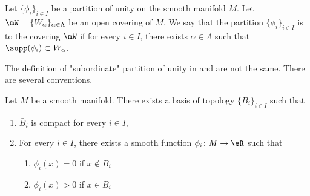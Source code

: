 \begin{definition}			\label{DEFooPJKOooFnCkuk}
	Let \( \{ \phi_i \}_{i\in I}\) be a partition of unity on the smooth manifold \( M\). Let \( \mW=\{ W_{\alpha} \}_{\alpha\in \Lambda}\) be an open covering of \( M\). We say that the partition \( \{ \phi_i \}_{i\in I}\) is  to the covering \( \mW\) if for every \( i\in I\), there exists \( \alpha\in\Lambda\) such that \( \supp(\phi_i)\subset W_{\alpha}\).
\end{definition}

\begin{normaltext}
	The definition of "subordinate" partition of unity in \cite{BIBooAQKHooVyiyN} and \cite{BIBooKCFIooSAYbJK} are not the same. There are several conventions.
\end{normaltext}

\begin{lemma}		\label{LEMooBBBNooVmpLok}
	Let \( M\) be a smooth manifold. There exists a basis of topology \( \{ B_i \}_{i\in I}\) such that
	\begin{enumerate}
		\item
		      \( \bar B_i\) is compact for every \(  i\in I\),
		\item
		      For every \( i\in I\), there exists a smooth function \(\phi_i \colon M\to \eR  \) such that
		      \begin{enumerate}
			      \item
			            \( \phi_i(x)=0\) if \( x\notin B_i\)
			      \item
			            \( \phi_i(x)>0\) if \( x\in B_i\)
		      \end{enumerate}
	\end{enumerate}
\end{lemma}

